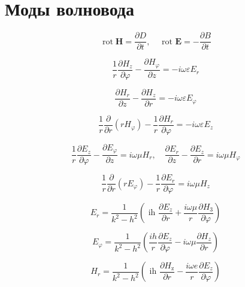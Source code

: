 \section{Моды волновода}

\begin{equation}
\operatorname{rot} \mathbf{H}=\frac{\partial D}{\partial t}, \quad \text { rot } \mathbf{E}=-\frac{\partial B}{\partial t}
\end{equation}

\begin{equation}\frac{1}{r} \frac{\partial H_{z}}{\partial \varphi}-\frac{\partial H_{\varphi}}{\partial z}=-i \omega \varepsilon E_{r}
\end{equation}

\begin{equation}
 \frac{\partial H_{r}}{\partial z}-\frac{\partial H_{z}}{\partial r}=-i \omega \varepsilon E_{\varphi}
\end{equation}
 
\begin{equation}\frac{1}{r} \frac{\partial}{\partial r}\left(r H_{\varphi}\right)-\frac{1}{r} \frac{\partial H_{r}}{\partial \varphi}=-i \omega \varepsilon E_{z}
\end{equation}

\begin{equation}\frac{1}{r} \frac{\partial E_{z}}{\partial \varphi}-\frac{\partial E_{\varphi}}{\partial z}=i \omega \mu H_{r}, \quad \frac{\partial E_{r}}{\partial z}-\frac{\partial E_{z}}{\partial r}=i \omega \mu H_{\varphi}
\end{equation}

\begin{equation}\frac{1}{r} \frac{\partial}{\partial r}\left(r E_{\varphi}\right)-\frac{1}{r} \frac{\partial E_{r}}{\partial \varphi}=i \omega \mu H_{z}
\end{equation}


\begin{equation}
E_{r}=\frac{1}{k^{2}-h^{2}}\left(\text { ih } \frac{\partial E_{z}}{\partial r}+\frac{i \omega \mu}{r} \frac{\partial H_{3}}{\partial \varphi}\right) 
\end{equation}

\begin{equation}
E_{\varphi}=\frac{1}{k^{2}-h^{2}}\left(\frac{i h}{r} \frac{\partial E_{z}}{\partial \varphi}-i \omega \mu \frac{\partial H_{z}}{\partial r}\right)
\end{equation}

 
 \begin{equation}
 H_{r}=\frac{1}{k^{2}-h^{2}}\left(\text { ih } \frac{\partial H_{\mathrm{z}}}{\partial r}-\frac{i \omega e}{r} \frac{\partial E_{z}}{\partial \varphi}\right)
 \end{equation}
  
